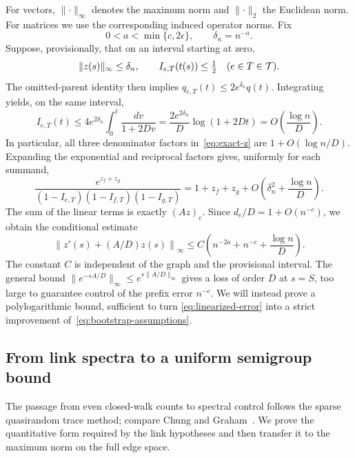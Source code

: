 For vectors, $\lVert\cdot\rVert_\infty$ denotes the maximum norm and
$\lVert\cdot\rVert_2$ the Euclidean norm.  For matrices we use the
corresponding induced operator norms.  Fix
\begin{equation}\label{eq:bootstrap-exponent}
 0<a<\min\{c,2\epsilon\},\qquad \delta_n=n^{-a}.
\end{equation}
Suppose, provisionally, that on an interval starting at zero,
\begin{equation}\label{eq:bootstrap-assumptions}
 \lVert z(s)\rVert_\infty\le\delta_n,
 \qquad I_{e,T}(t(s))\le\tfrac12
 \quad(e\in T\in\mathcal T).
\end{equation}
The omitted-parent identity then implies
$q_{e,T}(t)\le2e^{\delta_n}q(t)$.  Integrating yields, on the same
interval,
\begin{equation}\label{eq:I-bootstrap}
 I_{e,T}(t)
 \le4e^{2\delta_n}\int_0^t\frac{dv}{1+2Dv}
 =\frac{2e^{2\delta_n}}D\log(1+2Dt)
 =O\!\left(\frac{\log n}{D}\right).
\end{equation}
In particular, all three denominator factors in~\eqref{eq:exact-z}
are $1+O(\log n/D)$.  Expanding the exponential and reciprocal
factors gives, uniformly for each summand,
\[
 \frac{e^{z_f+z_g}}
 {(1-I_{e,T})(1-I_{f,T})(1-I_{g,T})}
 =1+z_f+z_g+
 O\!\left(\delta_n^2+\frac{\log n}{D}\right).
\]
The sum of the linear terms is exactly $(Az)_e$.  Since
$d_e/D=1+O(n^{-c})$, we obtain the conditional estimate
\begin{equation}\label{eq:linearized-error}
 \left\lVert z'(s)+(A/D)z(s)\right\rVert_\infty
 \le C\left(n^{-2a}+n^{-c}+\frac{\log n}{D}\right).
\end{equation}
The constant $C$ is independent of the graph and the provisional
interval.  The general bound
$\lVert e^{-sA/D}\rVert_\infty\le
e^{s\lVert A/D\rVert_\infty}$ gives a loss of order $D$ at $s=S$,
too large to guarantee control of the prefix error $n^{-c}$.
We will instead prove a polylogarithmic bound, sufficient to turn
\eqref{eq:linearized-error} into a strict improvement
of~\eqref{eq:bootstrap-assumptions}.

\subsection{From link spectra to a uniform semigroup bound}

The passage from even closed-walk counts to spectral control follows
the sparse quasirandom trace method; compare Chung and
Graham~\cite[Theorem~1 and Facts~7--8]{ChungGraham2002}.
We prove the quantitative form required by the link hypotheses and then
transfer it to the maximum norm on the full edge space.

